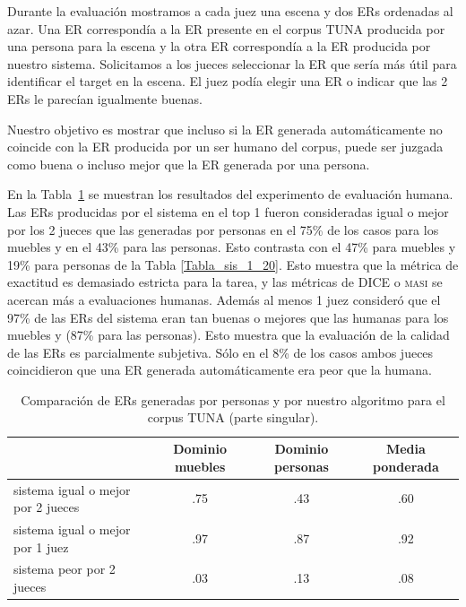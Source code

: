 Durante la evaluaci\'on mostramos a cada juez una escena y dos ERs ordenadas al azar. Una ER correspond\'ia a la ER presente en el corpus TUNA producida por una persona para la escena y la otra ER correspond\'ia a la ER producida por nuestro sistema. Solicitamos a los jueces seleccionar la ER que ser\'{i}a m\'as \'util para identificar el target en la escena. El juez pod\'ia elegir una ER o indicar que las 2 ERs le parec\'ian igualmente buenas.

Nuestro objetivo es mostrar que incluso si la ER generada autom\'aticamente no coincide con la ER producida por un ser humano del corpus, puede ser juzgada como buena o incluso mejor que la ER generada por una persona.

En la Tabla~\ref{system-versus-human} se muestran los resultados del experimento de evaluaci\'on humana.
Las ERs producidas por el sistema en el top 1 fueron consideradas igual o mejor por los 2 jueces que las generadas por personas en el 75\% de los casos para los muebles y en el 43\% para las personas. Esto contrasta con el 47\% para muebles y 19\% para personas de la Tabla \ref{Tabla_sis_1_20}. Esto muestra que la m\'etrica de exactitud es demasiado estricta para la tarea, y las m\'etricas de DICE o \textsc {masi} se acercan m\'as a evaluaciones humanas. Adem\'as al menos 1 juez consider\'o que el 97\% de las ERs del sistema eran tan buenas o mejores que las humanas para los muebles y (87\% para las personas). Esto muestra que la evaluaci\'on de la calidad de las ERs es parcialmente subjetiva. S\'olo en el 8\% de los casos ambos jueces coincidieron que una ER generada autom\'aticamente era peor que la humana.

\begin{table}[H]
\begin{center}
\begin{tabular}{|l|c|c|c|}
\hline

 & Dominio muebles & Dominio personas & Media ponderada \\
\hline
sistema igual o mejor por 2 jueces  &.75  &       .43	&       .60 \\
sistema igual o mejor por 1 juez  &.97	&	.87	&	.92 \\
sistema peor por 2 jueces &	.03	&	.13	&	.08 \\
\hline
\end{tabular}
\caption{Comparaci\'on de ERs generadas por personas y por nuestro algoritmo para el corpus TUNA (parte singular).} 
\label{system-versus-human}
\vspace*{-.5cm}
\end{center}
\end{table}

